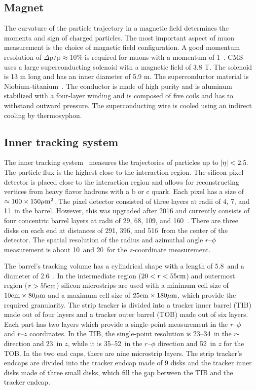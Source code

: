 \subsection{Magnet}

The curvature of the particle trajectory in a magnetic field determines the momenta and sign of charged particles. The most important aspect of muon measurement is the choice of magnetic field configuration. A good momentum resolution of $\Delta \text{p} / \text{p} \approx 10 \%$ is required for muons with a momentum of 1~\TeV. CMS uses a large superconducting solenoid with a magnetic field of 3.8 T. The solenoid is 13 m long and has an inner diameter of 5.9 m. The superconductor material is Niobium-titanium~\cite{BUL-NA-2003-150}. The conductor is made of high purity and is aluminum stabilized with a four-layer winding and is composed of five coils and has to withstand outward pressure. The superconducting wire is cooled using an indirect cooling by thermosyphon.

\subsection{Inner tracking system}

The inner tracking system~\cite{Khachatryan:2010pw} measures the trajectories of particles up to $\lvert\eta\rvert < 2.5$. The particle flux is the highest close to the interaction region. The silicon pixel detector is placed close to the interaction region and allows for reconstructing vertices from heavy flavor hadrons with a b or c quark. Each pixel has a size of $\approx 100 \times 150 \mu \text{m}^{2}$.  The pixel detector consisted of three layers at radii of 4, 7, and 11~\cm in the barrel. However, this was upgraded after 2016 and currently consists of four concentric barrel layers at radii of 29, 68, 109, and 160~\mm. There are three disks on each end at distances of 291, 396, and 516~\mm from the center of the detector. The spatial resolution of the radius and azimuthal angle $r$--$\phi$ measurement is about 10~\mum and 20~\mum for the $z$-coordinate measurement.

The barrel's tracking volume has a cylindrical shape with a length of 5.8~\m and a diameter of 2.6~\m. In the intermediate region ($20 < r < 55 \text{cm}$) and outermost region ($r > 55 \text{cm}$) silicon microstrips are used with a minimum cell size of $10 \text{cm} \times 80 \mu \text{m}$ and a maximum cell size of $25 \text{cm} \times 180 \mu \text{m}$, which provide the required granularity. The strip tracker is divided into a tracker inner barrel (TIB) made out of four layers and a tracker outer barrel (TOB) made out of six layers. Each part has two layers which provide a single-point measurement in the $r$--$\phi$ and $r$--$z$ coordinates. In the TIB, the single-point resolution is 23--34~\mum in the $r$-direction and 23~\mum in $z$, while it is 35--52~\mum in the $r$--$\phi$ direction and 52~\mum in $z$ for the TOB. In the two end caps, there are nine microstrip layers. The strip tracker's endcaps are divided into the tracker endcap made of 9 disks and the tracker inner disks made of three small disks, which fill the gap between the TIB and the tracker endcap.

